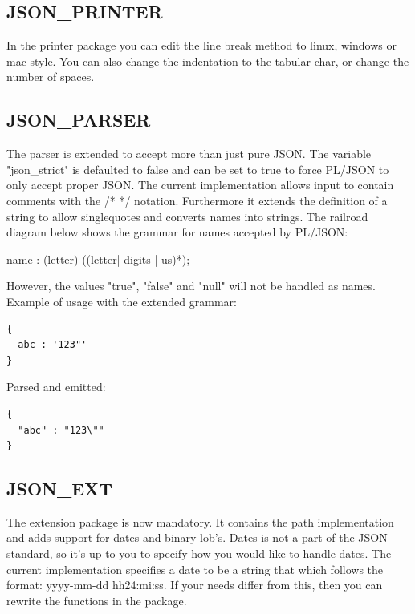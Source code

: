 \documentclass[11pt,a4paper]{article}
\begin{document}
\subsection*{JSON\_PRINTER}
In the printer package you can edit the line break method to linux, windows or mac style. You can also change the indentation to the tabular char, or change the number of spaces. 

\subsection*{JSON\_PARSER}
The parser is extended to accept more than just pure JSON. The variable "json\_strict" is defaulted to false and can be set to true to force PL/JSON to only accept proper JSON. The current implementation allows input to contain comments with the /* */  notation. Furthermore it extends the definition of a string to allow singlequotes and converts names into strings. The railroad diagram below shows the grammar for names accepted by PL/JSON:
\begin{rail}
name     : (letter) ((letter| digits | us)*);
\end{rail}
However, the values "true", "false" and "null" will not be handled as names.\\
Example of usage with the extended grammar:
\begin{verbatim}
{
  abc : '123"'
}
\end{verbatim}
Parsed and emitted:
\begin{verbatim}
{
  "abc" : "123\""
}
\end{verbatim}

\subsection*{JSON\_EXT}
The extension package is now mandatory. It contains the path implementation and adds support for dates and binary lob's. Dates is not a part of the JSON standard, so it's up to you to specify how you would like to handle dates. The current implementation specifies a date to be a string that which follows the format: yyyy-mm-dd hh24:mi:ss. If your needs differ from this, then you can rewrite the functions in the package.
\end{document}
